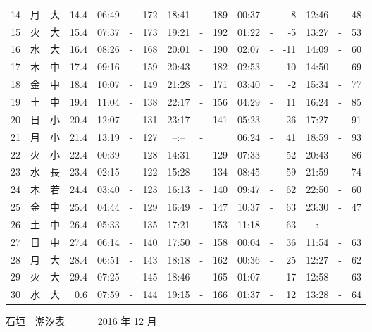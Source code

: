 \documentclass[12pt.a4j]{jsarticle}
\begin{document}
\begin{center}
\begin{table}[ht]
\begin{tabular}{|rc|cr|ccrccr|ccrccr|}
14 & 月 & 大 & 14.4 &  06:49 &-& 172  &  18:41 &-& 189  &   00:37 &-&   8  &   12:46 &-&  48  \\
15 & 火 & 大 & 15.4 &  07:37 &-& 173  &  19:21 &-& 192  &   01:22 &-&  -5  &   13:27 &-&  53  \\
16 & 水 & 大 & 16.4 &  08:26 &-& 168  &  20:01 &-& 190  &   02:07 &-& -11  &   14:09 &-&  60  \\
17 & 木 & 中 & 17.4 &  09:16 &-& 159  &  20:43 &-& 182  &   02:53 &-& -10  &   14:50 &-&  69  \\
18 & 金 & 中 & 18.4 &  10:07 &-& 149  &  21:28 &-& 171  &   03:40 &-&  -2  &   15:34 &-&  77  \\
19 & 土 & 中 & 19.4 &  11:04 &-& 138  &  22:17 &-& 156  &   04:29 &-&  11  &   16:24 &-&  85  \\
20 & 日 & 小 & 20.4 &  12:07 &-& 131  &  23:17 &-& 141  &   05:23 &-&  26  &   17:27 &-&  91  \\
21 & 月 & 小 & 21.4 &  13:19 &-& 127  &  --:-- &-&     &   06:24 &-&  41  &   18:59 &-&  93  \\
22 & 火 & 小 & 22.4 &  00:39 &-& 128  &  14:31 &-& 129  &   07:33 &-&  52  &   20:43 &-&  86  \\
23 & 水 & 長 & 23.4 &  02:15 &-& 122  &  15:28 &-& 134  &   08:45 &-&  59  &   21:59 &-&  74  \\
24 & 木 & 若 & 24.4 &  03:40 &-& 123  &  16:13 &-& 140  &   09:47 &-&  62  &   22:50 &-&  60  \\
25 & 金 & 中 & 25.4 &  04:44 &-& 129  &  16:49 &-& 147  &   10:37 &-&  63  &   23:30 &-&  47  \\
26 & 土 & 中 & 26.4 &  05:33 &-& 135  &  17:21 &-& 153  &   11:18 &-&  63  &   --:-- &-&     \\
27 & 日 & 中 & 27.4 &  06:14 &-& 140  &  17:50 &-& 158  &   00:04 &-&  36  &   11:54 &-&  63  \\
28 & 月 & 大 & 28.4 &  06:51 &-& 143  &  18:18 &-& 162  &   00:36 &-&  25  &   12:27 &-&  62  \\
29 & 火 & 大 & 29.4 &  07:25 &-& 145  &  18:46 &-& 165  &   01:07 &-&  17  &   12:58 &-&  63  \\
30 & 水 & 大 &  0.6 &  07:59 &-& 144  &  19:15 &-& 166  &   01:37 &-&  12  &   13:28 &-&  64  \\
   \hline
   \end{tabular}
\end{table}
\newpage
 {\LARGE 石垣　潮汐表　　　}
 {\large 2016 年 12 月}\\
 \begin{table}[ht]

\end{table}
\end{center}
\end{document}

